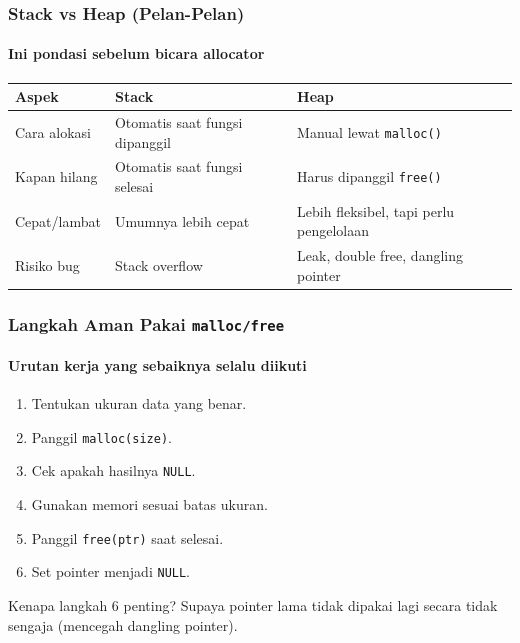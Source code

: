 \documentclass[t,aspectratio=169,xcolor=dvipsnames]{beamer}
\begin{document}
\begin{frame}
    \frametitle{Stack vs Heap (Pelan-Pelan)}
    \framesubtitle{Ini pondasi sebelum bicara allocator}
    \small
    \begin{table}[]
        \centering
        \begin{tabular}{p{}p{}p{}}
            \toprule
            \textbf{Aspek} & \textbf{Stack} & \textbf{Heap} \\
            \midrule
            Cara alokasi & Otomatis saat fungsi dipanggil & Manual lewat \texttt{malloc()} \\
            Kapan hilang & Otomatis saat fungsi selesai & Harus dipanggil \texttt{free()} \\
            Cepat/lambat & Umumnya lebih cepat & Lebih fleksibel, tapi perlu pengelolaan \\
            Risiko bug & Stack overflow & Leak, double free, dangling pointer \\
            \bottomrule
        \end{tabular}
    \end{table}
\end{frame}

\begin{frame}
    \frametitle{Langkah Aman Pakai \texttt{malloc/free}}
    \framesubtitle{Urutan kerja yang sebaiknya selalu diikuti}
    \small
    \begin{enumerate}
        \item Tentukan ukuran data yang benar.
        \item Panggil \texttt{malloc(size)}.
        \item Cek apakah hasilnya \texttt{NULL}.
        \item Gunakan memori sesuai batas ukuran.
        \item Panggil \texttt{free(ptr)} saat selesai.
        \item Set pointer menjadi \texttt{NULL}.
    \end{enumerate}
    \begin{exampleblock}{Kenapa langkah 6 penting?}
        Supaya pointer lama tidak dipakai lagi secara tidak sengaja (mencegah dangling pointer).
    \end{exampleblock}
\end{frame}
\end{document}

